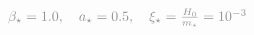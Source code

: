 \documentclass[preview]{standalone}
\begin{document}
$\textcolor{Gray}{\beta_{\star} = 1.0, \quad a_{\star} = 0.5, \quad \xi_{\star} = \frac{H_0}{m_{\star}} = 10^{-3}}$
\end{document}
